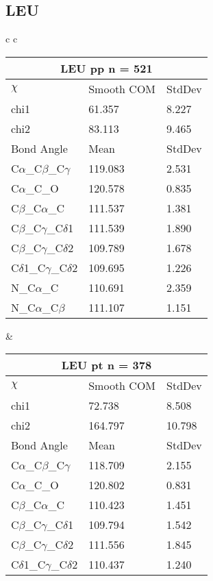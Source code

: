 \newpage
\subsection{LEU}

\begin{longtable}{ c c }

  \begin{tabular}{ l l l }
  \toprule
  \multicolumn{3}{c}{LEU \textbf{pp} n = 521} \\ \toprule
  $\chi$       & Smooth COM & StdDev \\ \midrule
  chi1 & 61.357 & 8.227 \\ 
  chi2 & 83.113 & 9.465 \\ \midrule
  Bond Angle   & Mean     & StdDev \\ \midrule
  C$\alpha$\_C$\beta$\_C$\gamma$ & 119.083 & 2.531\\
  C$\alpha$\_C\_O & 120.578 & 0.835\\
  C$\beta$\_C$\alpha$\_C & 111.537 & 1.381\\
  C$\beta$\_C$\gamma$\_C$\delta$1 & 111.539 & 1.890\\
  C$\beta$\_C$\gamma$\_C$\delta$2 & 109.789 & 1.678\\
  C$\delta$1\_C$\gamma$\_C$\delta$2 & 109.695 & 1.226\\
  N\_C$\alpha$\_C & 110.691 & 2.359\\
  N\_C$\alpha$\_C$\beta$ & 111.107 & 1.151\\
  \bottomrule
  \end{tabular}
  &
  \begin{tabular}{ l l l }
  \toprule
  \multicolumn{3}{c}{LEU \textbf{pt} n = 378} \\ \toprule
  $\chi$       & Smooth COM & StdDev \\ \midrule
  chi1 & 72.738 & 8.508 \\ 
  chi2 & 164.797 & 10.798 \\ \midrule
  Bond Angle   & Mean     & StdDev \\ \midrule
  C$\alpha$\_C$\beta$\_C$\gamma$ & 118.709 & 2.155\\
  C$\alpha$\_C\_O & 120.802 & 0.831\\
  C$\beta$\_C$\alpha$\_C & 110.423 & 1.451\\
  C$\beta$\_C$\gamma$\_C$\delta$1 & 109.794 & 1.542\\
  C$\beta$\_C$\gamma$\_C$\delta$2 & 111.556 & 1.845\\
  C$\delta$1\_C$\gamma$\_C$\delta$2 & 110.437 & 1.240\\

\end{tabular}
\end{longtable}
